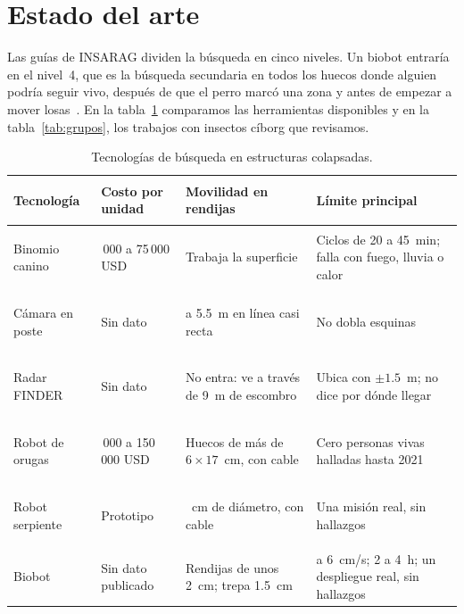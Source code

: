 \section{Estado del arte}
\label{sec:arte}

Las guías de INSARAG dividen la búsqueda en cinco niveles. Un biobot entraría en el nivel~4, que es la búsqueda secundaria
en todos los huecos donde alguien podría seguir vivo, después de que el perro marcó una zona y antes de empezar a mover
losas~\cite{insarag}. En la tabla~\ref{tab:tecnologias} comparamos las herramientas disponibles y en la
tabla~\ref{tab:grupos}, los trabajos con insectos cíborg que revisamos.

\begin{table}[!htb]
\centering\footnotesize
\caption{Tecnologías de búsqueda en estructuras colapsadas.}
\label{tab:tecnologias}
\begin{tabularx}{\textwidth}{@{}>{\bfseries\raggedright\arraybackslash}p{2.5cm} >{\raggedright\arraybackslash}p{3.0cm} >{\raggedright\arraybackslash}p{3.8cm} >{\raggedright\arraybackslash}X@{}}
\toprule
\rowcolor{TableHead} Tecnología & Costo por unidad & Movilidad en rendijas & Límite principal \\
\midrule
Binomio canino & 50\,000 a 75\,000 USD~\cite{sdf} & Trabaja la superficie & Ciclos de 20 a 45~min; falla con fuego, lluvia o calor~\cite{murphy2004} \\
Cámara en poste & Sin dato & 2 a 5.5~m en línea casi recta & No dobla esquinas~\cite{murphy2021} \\
Radar FINDER & Sin dato & No entra: ve a través de 9~m de escombro & Ubica con $\pm1.5$~m; no dice por dónde llegar~\cite{jpl2015} \\
Robot de orugas & 50\,000 a 150\,000 USD~\cite{murphy2021} & Huecos de más de $6\times17$~cm, con cable & Cero personas vivas halladas hasta 2021 \\
Robot serpiente & Prototipo & 5~cm de diámetro, con cable & Una misión real, sin hallazgos~\cite{whitman2018} \\
Biobot & Sin dato publicado & Rendijas de unos 2~cm; trepa 1.5~cm & 3 a 6~cm/s; 2 a 4~h; un despliegue real, sin hallazgos~\cite{tranngoc2023,htx2025} \\
\bottomrule
\end{tabularx}
\end{table}

